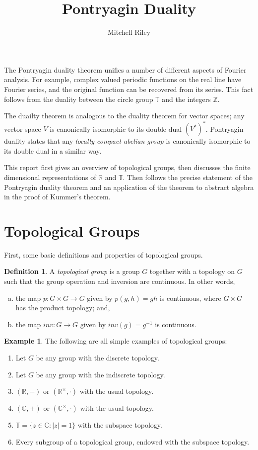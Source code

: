 \documentclass[12pt, a4paper]{article}
\author{Mitchell Riley}
\title{Pontryagin Duality}
\theoremstyle{definition}
\newtheorem{example}[theorem]{Example}
\newtheorem{definition}[theorem]{Definition}
\begin{document}
\maketitle

The Pontryagin duality theorem unifies a number of different aspects of Fourier analysis. For example, complex valued periodic functions on the real line have Fourier series, and the original function can be recovered from its series. This fact follows from the duality between the circle group $\mathbb{T}$ and the integers $\mathbb{Z}$.

The duailty theorem is analogous to the duality theorem for vector spaces; any vector space $V$ is canonically isomorphic to its double dual $(V^*)^*$. Pontryagin duality states that any \emph{locally compact abelian group} is canonically isomorphic to its double dual in a similar way.

This report first gives an overview of topological groups, then discusses the finite dimensional representations of $\mathbb{R}$ and $\mathbb{T}$. Then follows the precise statement of the Pontryagin duality theorem and an application of the theorem to abstract algebra in the proof of Kummer's theorem.

\section{Topological Groups}

First, some basic definitions and properties of topological groups.

\begin{definition}
A \emph{topological group} is a group $G$ together with a topology on $G$ such that the group operation and inversion are continuous. In other words,
\begin{enumerate}[a)]
\item the map $p : G \times G \to G$ given by $p(g, h) = gh$ is continuous, where $G \times G$ has the product topology; and,
\item the map $inv : G \to G$ given by $inv(g) = g^{-1}$ is continuous.
\end{enumerate}
\end{definition}

\begin{example}
The following are all simple examples of topological groups:
\begin{enumerate}
\itemsep0em
\item Let $G$ be any group with the discrete topology.
\item Let $G$ be any group with the indiscrete topology.
\item $(\mathbb{R}, +)$ or $(\mathbb{R}^\times, \cdot)$ with the usual topology.
\item $(\mathbb{C}, +)$ or $(\mathbb{C}^\times, \cdot)$ with the usual topology.
\item $\mathbb{T} = \{ z \in \mathbb{C} : |z| = 1 \}$ with the subspace topology.
\item Every subgroup of a topological group, endowed with the subspace topology.
\end{enumerate}
\end{example}
\end{document}
